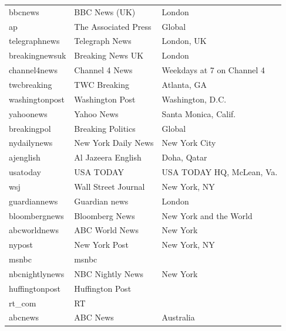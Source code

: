 {\begin{longtable}{lll}
    bbcnews          &  BBC News (UK)         &  London                      \\
    ap               &  The Associated Press  &  Global                      \\
    telegraphnews    &  Telegraph News        &  London, UK                  \\
    breakingnewsuk   &  Breaking News UK      &  London                      \\
    channel4news     &  Channel 4 News        &  Weekdays at 7 on Channel 4  \\
    twcbreaking      &  TWC Breaking          &  Atlanta, GA                 \\
    washingtonpost   &  Washington Post       &  Washington, D.C.            \\
    yahoonews        &  Yahoo News            &  Santa Monica, Calif.        \\
    breakingpol      &  Breaking Politics     &  Global                      \\
    nydailynews      &  New York Daily News   &  New York City               \\
    ajenglish        &  Al Jazeera English    &  Doha, Qatar                 \\
    usatoday         &  USA TODAY             &  USA TODAY HQ, McLean, Va.   \\
    wsj              &  Wall Street Journal   &  New York, NY                \\
    guardiannews     &  Guardian news         &  London                      \\
    bloombergnews    &  Bloomberg News        &  New York and the World      \\
    abcworldnews     &  ABC World News        &  New York                    \\
    nypost           &  New York Post         &  New York, NY                \\
    msnbc            &  msnbc                 &                              \\
    nbcnightlynews   &  NBC Nightly News      &  New York                    \\
    huffingtonpost   &  Huffington Post       &                              \\
    rt\_com           &  RT                    &                              \\
    abcnews          &  ABC News              &  Australia                   \\

\end{longtable}}
